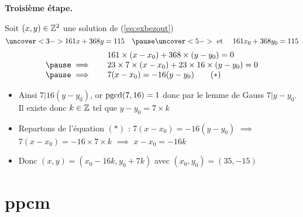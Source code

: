 \begin{frame}

\textbf{Troisième étape.} 

\pause

Soit $(x,y) \in \mathbb{Z}^2$ une solution de (\ref{eq:exbezout})
$$\uncover<3->{161x+368y=115} \quad \pause \uncover<5->{\text{ et } \quad 161x_0+368y_0=115}$$
\pause\pause\pause
\vspace*{-2ex}
$$\begin{array}{ll}
& 161 \times (x-x_0) + 368 \times (y-y_0) = 0 \\
\pause
\implies \quad & 23 \times 7 \times (x-x_0) + 23 \times 16 \times  (y-y_0) = 0 \\
\pause
\implies \quad & 7 (x-x_0) = -16 (y-y_0) \qquad  (*)\\
\end{array}$$
\vspace*{-2ex}
\pause
\begin{itemize}
  \item Ainsi $7 | 16(y-y_0)$,
\pause
or $\mathop{\text{pgcd}}\nolimits(7,16)=1$ donc par le lemme de Gauss $7|y-y_0$.
\pause
Il existe donc $k\in \mathbb{Z}$ tel que $y-y_0 = 7 \times k$
\pause
  \item Repartons de l'équation $(*)$ : $7 (x-x_0) = -16 (y-y_0)$
\pause
$\implies$ $7(x-x_0)=-16\times 7 \times k$
\pause
$\implies$ $x-x_0 = -16k$
\pause
  \item Donc $(x,y) = (x_0-16k,y_0+7k)$ \pause\quad  avec \quad  $(x_0,y_0)=(35,-15)$
\end{itemize}

\pause


  
\end{frame}

\section{ppcm}

